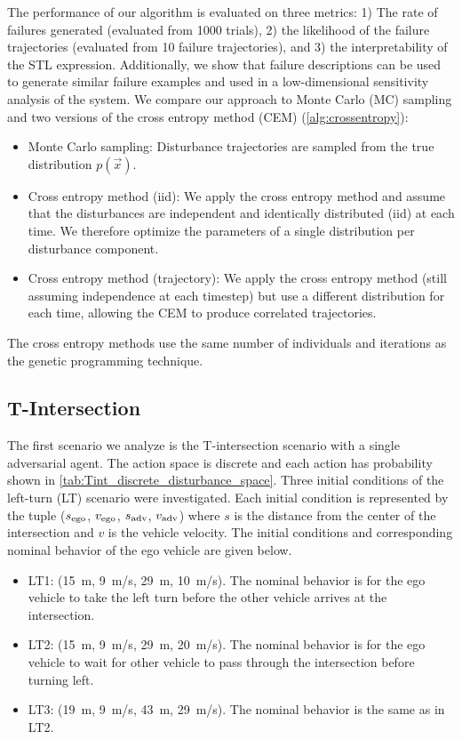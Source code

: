 The performance of our algorithm is evaluated on three metrics: 1) The rate of failures generated (evaluated from \num{1000} trials), 2) the likelihood of the failure trajectories (evaluated from \num{10} failure trajectories), and 3) the interpretability of the STL expression. Additionally, we show that failure descriptions can be used to generate similar failure examples and used in a low-dimensional sensitivity analysis of the system. We compare our approach to Monte Carlo (MC) sampling and two versions of the cross entropy method (CEM) (\cref{alg:crossentropy}):
\begin{itemize}
    \item Monte Carlo sampling: Disturbance trajectories are sampled from the true distribution $p(\vec{x})$.
    \item Cross entropy method (iid): We apply the cross entropy method and assume that the disturbances are independent and identically distributed (iid) at each time. We therefore optimize the parameters of a single distribution per disturbance component. 
    \item Cross entropy method (trajectory): We apply the cross entropy method (still assuming independence at each timestep) but use a different distribution for each time, allowing the CEM to produce correlated trajectories. 
\end{itemize}
The cross entropy methods use the same number of individuals and iterations as the genetic programming technique. 

\subsection{T-Intersection}

The first scenario we analyze is the T-intersection scenario with a single adversarial agent. The action space is discrete and each action has probability shown in \cref{tab:Tint_discrete_disturbance_space}.  Three initial conditions of the left-turn (LT) scenario were investigated. Each initial condition is represented by the tuple ($s_{\rm ego}$, $v_{\rm ego}$, $s_{\rm adv}$, $v_{\rm adv}$) where $s$ is the distance from the center of the intersection and $v$ is the vehicle velocity.  The initial conditions and corresponding nominal behavior of the ego vehicle are given below.
\begin{itemize}
    \item LT1: (\SI{15}{m}, \SI{9}{m/s}, \SI{29}{m}, \SI{10}{m/s}). The nominal behavior is for the ego vehicle to take the left turn before the other vehicle arrives at the intersection.
    \item LT2: (\SI{15}{m}, \SI{9}{m/s}, \SI{29}{m}, \SI{20}{m/s}). The nominal behavior is for the ego vehicle to wait for other vehicle to pass through the intersection before turning left.
    \item LT3: (\SI{19}{m}, \SI{9}{m/s}, \SI{43}{m}, \SI{29}{m/s}). The nominal behavior is the same as in LT2.
\end{itemize}

